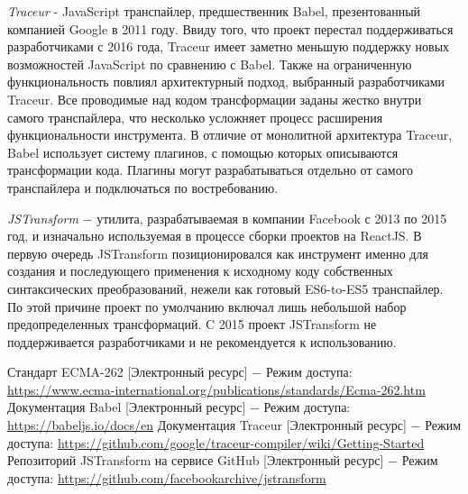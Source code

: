 \documentclass[14pt, a4paper]{article}
\begin{document}
\textit{Traceur} \cite{traceur} - JavaScript транспайлер, предшественник Babel, презентованный компанией Google в 2011 году. 
Ввиду того, что проект перестал поддерживаться разработчиками с 2016 года, Traceur имеет заметно 
меньшую поддержку новых возможностей JavaScript по сравнению с Babel. Также на ограниченную 
функциональность повлиял архитектурный подход, выбранный разработчиками Traceur. Все проводимые над 
кодом трансформации заданы жестко внутри самого транспайлера, что несколько усложняет процесс расширения 
функциональности инструмента. В отличие от монолитной архитектура Traceur, Babel использует систему 
плагинов, с помощью которых описываются трансформации кода. Плагины могут разрабатываться отдельно 
от самого транспайлера и подключаться по востребованию.

\textit{JSTransform} \cite{jstransform} $-$ утилита, разрабатываемая в компании Facebook с 2013 по 2015 год, и изначально используемая 
в процессе сборки проектов на ReactJS. В первую очередь JSTransform позиционировался как
инструмент именно для создания и последующего применения к исходному коду собственных синтаксических преобразований, 
нежели как готовый ES6-to-ES5 транспайлер. По этой причине проект по умолчанию включал лишь небольшой 
набор предопределенных трансформаций. C 2015 проект JSTransform не поддерживается разработчиками и 
не рекомендуется к использованию.

\pagebreak

\begin{thebibliography}{9}
   Стандарт ECMA-262 [Электронный ресурс] $-$ Режим доступа: \linebreak
    \url{https://www.ecma-international.org/publications/standards/Ecma-262.htm}
   Документация Babel [Электронный ресурс] $-$ Режим доступа: \linebreak
    \url{https://babeljs.io/docs/en}
   Документация Traceur [Электронный ресурс] $-$ Режим доступа: \linebreak
    \url{https://github.com/google/traceur-compiler/wiki/Getting-Started}
   Репозиторий JSTransform на сервисе GitHub [Электронный ресурс] $-$ Режим доступа:
    \url{https://github.com/facebookarchive/jstransform}
\end{thebibliography}
\end{document}
